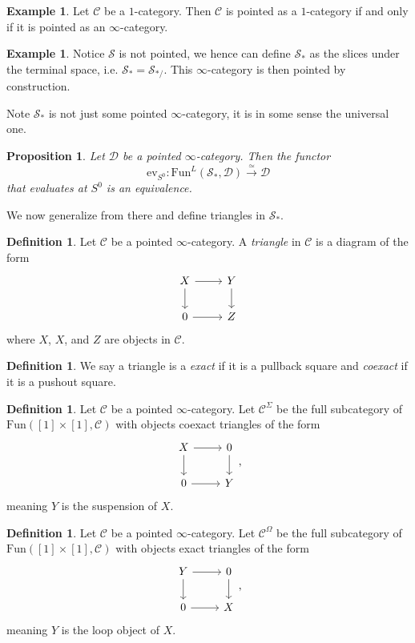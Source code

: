\documentclass[10pt]{amsart}
\newcommand{\C}{\mathscr{C}}
\newcommand{\D}{\mathscr{D}}
\newcommand{\s}{\mathscr{S}}
\newcommand{\Fun}{\mathrm{Fun}}
\newtheorem{proposition}[equation]{Proposition}
\theoremstyle{definition}
\newtheorem{definition}[equation]{Definition}
\newtheorem{example}[equation]{Example}
\theoremstyle{remark}
\begin{document}
\begin{example}
  Let $\C$ be a $1$-category. Then $\C$ is pointed as a $1$-category if and only if it is pointed as an $\infty$-category. 
\end{example}

\begin{example}
  Notice $\s$ is not pointed, we hence can define $\s_*$ as the slices under the terminal space, i.e. $\s_* = \s_{*/}$. This $\infty$-category is then pointed by construction.
\end{example}

Note $\s_*$ is not just some pointed $\infty$-category, it is in some sense the universal one.
\begin{proposition}
  Let $\D$ be a pointed $\infty$-category. Then the functor 
  \[\mathrm{ev}_{S^0}\colon\Fun^L(\s_*,\D) \xrightarrow{ \ \simeq \ } \D \]
  that evaluates at $S^0$ is an equivalence.
\end{proposition}

We now generalize from there and define triangles in $\s_*$. 

\begin{definition}
  Let $\C$ be a pointed $\infty$-category. A \emph{triangle} in $\C$ is a diagram of the form
  \[
  \begin{tikzcd}
   X \arrow[r]  \arrow[d] & Y \arrow[d] \\ 
   0 \arrow[r] & Z
  \end{tikzcd}
  \]
  where $X$, $X$, and $Z$ are objects in $\C$.
\end{definition}

\begin{definition}
  We say a triangle is a \emph{exact} if it is a pullback square and \emph{coexact} if it is a pushout square.
\end{definition}

\begin{definition}
  Let $\C$ be a pointed $\infty$-category. Let $\C^{\Sigma}$ be the full subcategory of $\Fun([1] \times [1],\C)$ with objects coexact triangles of the form 
  \[
  \begin{tikzcd}
   X \arrow[r]  \arrow[d] & 0 \arrow[d] \\ 
   0 \arrow[r] & Y
  \end{tikzcd},
  \]
  meaning $Y$ is the suspension of $X$.
\end{definition}

\begin{definition}
  Let $\C$ be a pointed $\infty$-category. Let $\C^{\Omega}$ be the full subcategory of $\Fun([1] \times [1],\C)$ with objects exact triangles of the form 
  \[
  \begin{tikzcd}
   Y \arrow[r]  \arrow[d] & 0 \arrow[d] \\ 
   0 \arrow[r] & X
  \end{tikzcd},
  \]
  meaning $Y$ is the loop object of $X$.
\end{definition}
\end{document}
